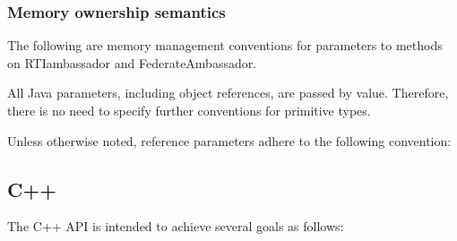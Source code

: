 \begin{compactstdpage}
    \subsubsection{Memory ownership semantics}

    The following are memory management conventions for parameters to methods on RTIambassador and FederateAmbassador.

    All Java parameters, including object references, are passed by value. Therefore, there is no need to specify further conventions for primitive types.

    Unless otherwise noted, reference parameters adhere to the following convention:


    \subsection{C++}

    The C++ API is intended to achieve several goals as follows:

\end{compactstdpage}

\clearpage

